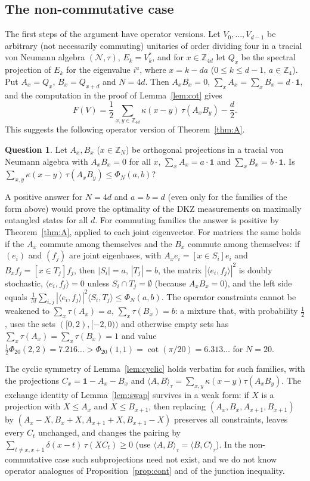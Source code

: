 \documentclass[11pt]{amsart}
\theoremstyle{definition}
\newtheorem{question}[theorem]{Question}
\theoremstyle{remark}
\newcommand{\Z}{\mathbb{Z}}
\newcommand{\ip}[2]{\langle #1,#2\rangle}
\newcommand{\one}{\mathbf{1}}
\begin{document}
\subsection{The non-commutative case}
The first steps of the argument have operator versions. Let $V_0,\dots,V_{d-1}$ be arbitrary (not necessarily
commuting) unitaries of order dividing four in a tracial von Neumann algebra $(\mathcal N,\tau)$, $E_k=V_k^*$, and for
$x\in\Z_{4d}$ let $Q_x$ be the spectral projection of $E_k$ for the eigenvalue $i^a$, where $x=k-da$ ($0\le k\le d-1$,
$a\in\Z_4$). Put $A_x=Q_x$, $B_x=Q_{x+d}$ and $N=4d$. Then $A_xB_x=0$, $\sum_xA_x=\sum_xB_x=d\cdot\one$, and the
computation in the proof of Lemma~\ref{lem:cot} gives
\begin{equation}\label{eq:projform}
F(V)=\frac12\sum_{x,y\in\Z_{4d}}\kappa(x-y)\,\tau(A_xB_y)-\frac d2 .
\end{equation}
This suggests the following operator version of Theorem~\ref{thm:A}.

\begin{question}\label{q:Lq}
Let $A_x,B_x$ ($x\in\Z_N$) be orthogonal projections in a tracial von Neumann algebra with $A_xB_x=0$ for all
$x$, $\sum_xA_x=a\cdot\one$ and $\sum_xB_x=b\cdot\one$. Is
$\sum_{x,y}\kappa(x-y)\,\tau(A_xB_y)\le\Phi_N(a,b)$?
\end{question}

A positive answer for $N=4d$ and $a=b=d$ (even only for the families of the form above) would prove the optimality
of the DKZ measurements on maximally entangled states for all $d$. For commuting families the answer is positive by
Theorem~\ref{thm:A}, applied to each joint eigenvector. For matrices the same holds if the $A_x$ commute among
themselves and the $B_x$ commute among themselves: if $(e_i)$ and $(f_j)$ are joint eigenbases, with
$A_xe_i=[x\in S_i]e_i$ and $B_xf_j=[x\in T_j]f_j$, then $|S_i|=a$, $|T_j|=b$, the matrix $|\langle e_i,f_j\rangle|^2$ is
doubly stochastic, $\langle e_i,f_j\rangle=0$ unless $S_i\cap T_j=\emptyset$ (because $A_xB_x=0$), and the left side
equals $\frac1M\sum_{i,j}|\langle e_i,f_j\rangle|^2\ip{S_i}{T_j}\le\Phi_N(a,b)$. The operator constraints cannot be
weakened to $\sum_x\tau(A_x)=a$, $\sum_x\tau(B_x)=b$: a mixture that, with probability $\frac12$, uses the sets
$([0,2),[-2,0))$ and otherwise empty sets has $\sum_x\tau(A_x)=\sum_x\tau(B_x)=1$ and value
$\frac12\Phi_{20}(2,2)=7.216\ldots>\Phi_{20}(1,1)=\cot(\pi/20)=6.313\ldots$ for $N=20$.

The cyclic symmetry of Lemma~\ref{lem:cyclic} holds verbatim for such families, with the projections
$C_x=\one-A_x-B_x$ and $\ip AB_\tau=\sum_{x,y}\kappa(x-y)\tau(A_xB_y)$. The exchange identity of Lemma~\ref{lem:swap}
survives in a weak form: if $X$ is a projection with $X\le A_x$ and $X\le B_{x+1}$, then replacing
$(A_x,B_x,A_{x+1},B_{x+1})$ by $(A_x-X,B_x+X,A_{x+1}+X,B_{x+1}-X)$ preserves all constraints, leaves every $C_t$
unchanged, and changes the pairing by $\sum_{t\ne x,x+1}\delta(x-t)\,\tau(XC_t)\ge0$ (use $\ip AB_\tau=\ip BC_\tau$).
In the non-commutative case such subprojections need not exist, and we do not know operator analogues of
Proposition~\ref{prop:cont} and of the junction inequality.
\end{document}
